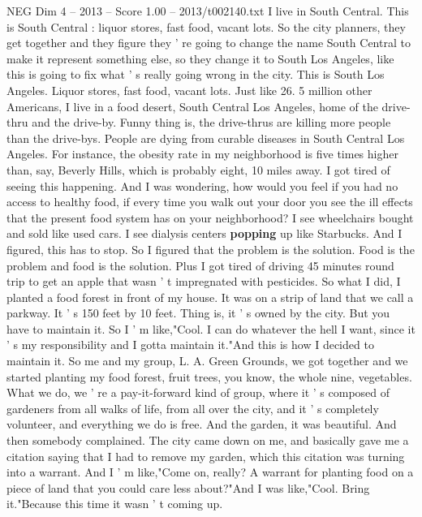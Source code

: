\begin{textsample}{NEG Dim 4 – 2013 – Score 1.00 – 2013/t002140.txt}  \label{ex:f4_neg_006}
I live in South Central.
This is South Central : liquor stores, fast food, vacant lots.
So the city planners, they get together and they figure they ' re going to change the name South Central to make it represent something else, so they change it to South Los Angeles, like this is going to fix what ' s really going wrong in the city.
This is South Los Angeles.
Liquor stores, fast food, vacant lots.
Just like 26. 5 million other Americans, I live in a food desert, South Central Los Angeles, home of the drive-thru and the drive-by.
Funny thing is, the drive-thrus are killing more people than the drive-bys.
People are dying from curable diseases in South Central Los Angeles.
For instance, the obesity rate in my neighborhood is five times higher than, say, Beverly Hills, which is probably eight, 10 miles away.
I got tired of seeing this happening.
And I was wondering, how would you feel if you had no access to healthy food, if every time you walk out your door you see the ill effects that the present food system has on your neighborhood?
I see wheelchairs bought and sold like used cars.
I see dialysis centers \textbf{popping} up like Starbucks.
And I figured, this has to stop.
So I figured that the problem is the solution.
Food is the problem and food is the solution.
Plus I got tired of driving 45 minutes round trip to get an apple that wasn ' t impregnated with pesticides.
So what I did, I planted a food forest in front of my house.
It was on a strip of land that we call a parkway.
It ' s 150 feet by 10 feet.
Thing is, it ' s owned by the city.
But you have to maintain it.
So I ' m like,"Cool.
I can do whatever the hell I want, since it ' s my responsibility and I gotta maintain it."And this is how I decided to maintain it.
So me and my group, L.
A.
Green Grounds, we got together and we started planting my food forest, fruit trees, you know, the whole nine, vegetables.
What we do, we ' re a pay-it-forward kind of group, where it ' s composed of gardeners from all walks of life, from all over the city, and it ' s completely volunteer, and everything we do is free.
And the garden, it was beautiful.
And then somebody complained.
The city came down on me, and basically gave me a citation saying that I had to remove my garden, which this citation was turning into a warrant.
And I ' m like,"Come on, really?
A warrant for planting food on a piece of land that you could care less about?"And I was like,"Cool.
Bring it."Because this time it wasn ' t coming up.

\end{textsample}
